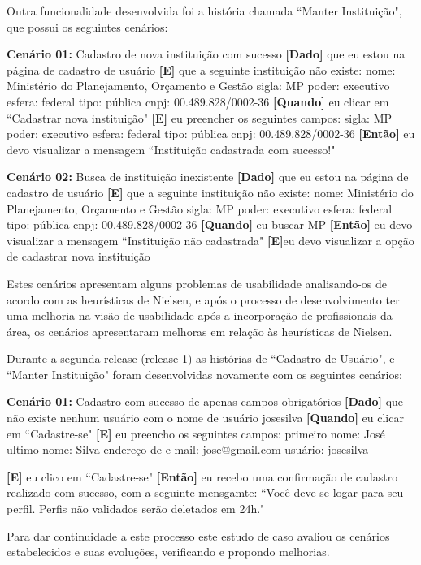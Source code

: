 Outra funcionalidade desenvolvida foi a história chamada ``Manter Instituição", que possui os seguintes cenários:

\textbf{Cenário 01:} Cadastro de nova instituição com sucesso
\textbf{[Dado]} que eu estou na página de cadastro de usuário
\textbf{[E]} que a seguinte instituição não existe:
  	nome: Ministério do Planejamento, Orçamento e Gestão
  	sigla: MP
 	poder: executivo
 	esfera: federal
  	tipo: pública
  	cnpj: 00.489.828/0002-36
\textbf{[Quando]} eu clicar em ``Cadastrar nova instituição" 
\textbf{[E]} eu preencher os seguintes campos:
  	sigla: MP
  	poder: executivo
  	esfera: federal
  	tipo: pública
  	cnpj: 00.489.828/0002-36
\textbf{[Então]} eu devo visualizar a mensagem ``Instituição cadastrada com sucesso!"

\textbf{Cenário 02:} Busca de instituição inexistente
\textbf{[Dado]} que eu estou na página de cadastro de usuário
\textbf{[E]} que a seguinte instituição não existe:
  nome: Ministério do Planejamento, Orçamento e Gestão
  sigla: MP
  poder: executivo
  esfera: federal
  tipo: pública
  cnpj: 00.489.828/0002-36
\textbf{[Quando]} eu buscar MP
\textbf{[Então]} eu devo visualizar a mensagem ``Instituição não cadastrada" 
\textbf{[E]}eu devo visualizar a opção de cadastrar nova instituição

Estes cenários apresentam alguns problemas de usabilidade analisando-os de acordo com as heurísticas de Nielsen, e após o processo de desenvolvimento ter uma melhoria na visão de usabilidade após a incorporação de profissionais da área, os cenários apresentaram melhoras em relação às heurísticas de Nielsen. 

Durante a segunda release (release 1) as histórias de ``Cadastro de Usuário", e ``Manter Instituição" foram desenvolvidas novamente com os seguintes cenários:

\textbf{Cenário 01:} Cadastro com sucesso de apenas campos obrigatórios
	\textbf{[Dado]} que não existe nenhum usuário com o nome de usuário josesilva 
	\textbf{[Quando]} eu clicar em ``Cadastre-se"
	\textbf{[E]} eu preencho os seguintes campos: 
  		primeiro nome: José
  		ultimo nome: Silva
  		endereço de e-mail: jose@gmail.com
  		usuário: josesilva
  		
	\textbf{[E]} eu clico em ``Cadastre-se"
	\textbf{[Então]} eu recebo uma confirmação de cadastro realizado com sucesso, com a seguinte mensgamte: 
	``Você deve se logar para seu perfil. Perfis não validados serão deletados em 24h."


Para dar continuidade a este processo este estudo de caso avaliou os cenários estabelecidos e suas evoluções, verificando e propondo melhorias.


